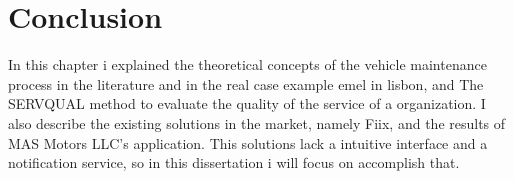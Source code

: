   

\section{Conclusion}

In this chapter i explained the theoretical concepts of the vehicle maintenance process in the literature and in the real case example \ac{emel} in lisbon, and The SERVQUAL method to evaluate the quality of the service of a organization.
I also describe the existing solutions in the market, namely Fiix, and the results of MAS Motors LLC's application.
This solutions lack a intuitive interface and a notification service, so in this dissertation i will focus on accomplish that.

